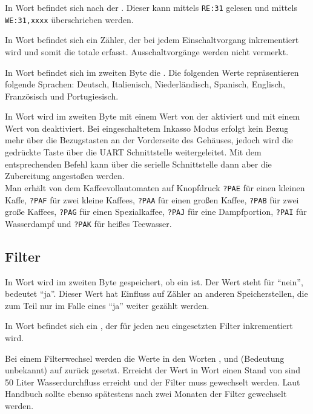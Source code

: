 In Wort  befindet sich nach \cite{GitCoffeeMachine} der .
Dieser kann mittels \texttt{RE:31} gelesen und mittels \texttt{WE:31,xxxx} überschrieben werden.

In Wort  befindet sich ein Zähler, der bei jedem Einschaltvorgang inkrementiert wird und somit die totale  erfasst.
Ausschaltvorgänge werden nicht vermerkt.

In Wort  befindet sich im zweiten Byte die .
Die folgenden Werte repräsentieren folgende Sprachen:
 Deutsch,
 Italienisch,
 Niederländisch, 
 Spanisch,
 Englisch,
 Französisch und
 Portugiesisch.

In Wort  wird im zweiten Byte mit einem Wert von  der  aktiviert und mit einem Wert von  deaktiviert.
Bei eingeschaltetem Inkasso Modus erfolgt kein Bezug mehr über die Bezugstasten an der Vorderseite des Gehäuses, jedoch wird die gedrückte Taste über die \ac{UART} Schnittstelle weitergeleitet.
Mit dem entsprechenden Befehl kann über die serielle Schnittstelle dann aber die Zubereitung angestoßen werden.\\
Man erhält von dem Kaffeevollautomaten auf Knopfdruck
\texttt{?PAE} für einen kleinen Kaffe,
\texttt{?PAF} für zwei kleine Kaffees,
\texttt{?PAA} für einen großen Kaffee,
\texttt{?PAB} für zwei große Kaffees,
\texttt{?PAG} für einen Spezialkaffee,
\texttt{?PAJ} für eine Dampfportion,
\texttt{?PAI} für Wasserdampf und
\texttt{?PAK} für heißes Teewasser.

\subsection{Filter}
In Wort  wird im zweiten Byte gespeichert, ob ein  ist.
Der Wert  steht für "`nein"',  bedeutet "`ja"'.
Dieser Wert hat Einfluss auf Zähler an anderen Speicherstellen, die zum Teil nur im Falle eines "`ja"' weiter gezählt werden.

In Wort  befindet sich ein , der für jeden neu eingesetzten Filter inkrementiert wird.

Bei einem Filterwechsel werden die Werte in den Worten ,  und  (Bedeutung unbekannt) auf  zurück gesetzt.
Erreicht der Wert in Wort  einen Stand von  sind 50 Liter Wasserdurchfluss erreicht und der Filter muss gewechselt werden.
Laut Handbuch sollte ebenso spätestens nach zwei Monaten der Filter gewechselt werden.

